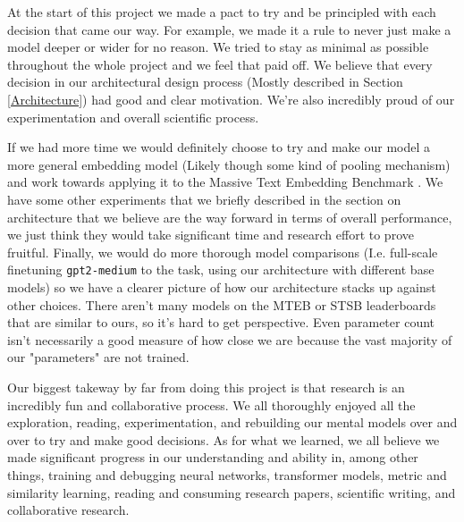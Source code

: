 \documentclass{article}
\begin{document}
At the start of this project we made a pact to try and be principled with each decision that came our way. For example, we made it a rule to never just make a model deeper or wider for no reason. We tried to stay as minimal as possible throughout the whole project and we feel that paid off. We believe that every decision in our architectural design process (Mostly described in Section \ref{Architecture}) had good and clear motivation. We're also incredibly proud of our experimentation and overall scientific process.

If we had more time we would definitely choose to try and make our model a more general embedding model (Likely though some kind of pooling mechanism) and work towards applying it to the Massive Text Embedding Benchmark \cite{muennighoff2022mteb}. We have some other experiments that we briefly described in the section on architecture that we believe are the way forward in terms of overall performance, we just think they would take significant time and research effort to prove fruitful. Finally, we would do more thorough model comparisons (I.e. full-scale finetuning \verb|gpt2-medium| to the task, using our architecture with different base models) so we have a clearer picture of how our architecture stacks up against other choices. There aren't many models on the MTEB or STSB leaderboards that are similar to ours, so it's hard to get perspective. Even parameter count isn't necessarily a good measure of how close we are because the vast majority of our "parameters" are not trained.

Our biggest takeway by far from doing this project is that research is an incredibly fun and collaborative process. We all thoroughly enjoyed all the exploration, reading, experimentation, and rebuilding our mental models over and over to try and make good decisions. As for what we learned, we all believe we made significant progress in our understanding and ability in, among other things, training and debugging neural networks, transformer models, metric and similarity learning, reading and consuming research papers, scientific writing, and collaborative research.
\end{document}
